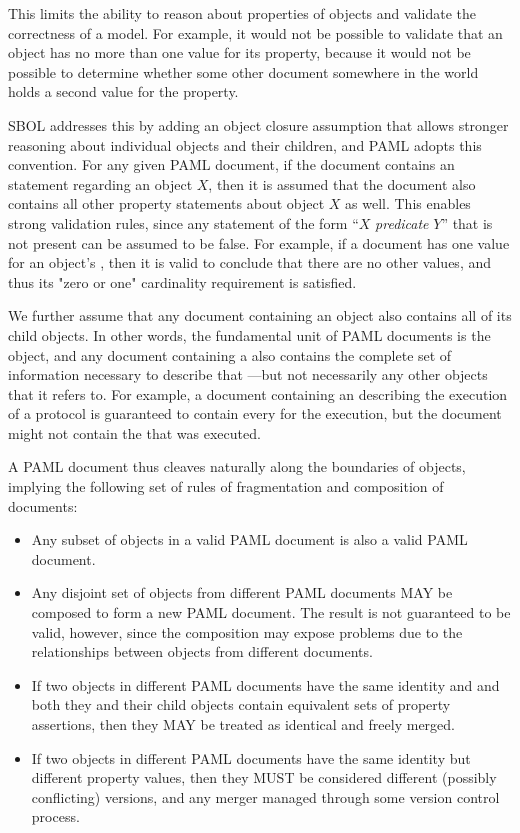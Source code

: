 This limits the ability to reason about properties of objects and validate the correctness of a model.
For example, it would not be possible to validate that an  object has no more than one value for its  property, because it would not be possible to determine whether some other document somewhere in the world holds a second value for the property.

SBOL addresses this by adding an object closure assumption that allows stronger reasoning about individual objects and their children, and PAML adopts this convention.
For any given PAML document, if the document contains an  statement regarding an  object $X$, then it is assumed that the document also contains all other property statements about object $X$ as well. 
This enables strong validation rules, since any statement of the form ``$X$ {\it predicate} $Y$'' that is not present can be assumed to be false.
For example, if a document has one value for an object's , then it is valid to conclude that there are no other  values, and thus its "zero or one" cardinality requirement is satisfied.

We further assume that any document containing an object also contains all of its child objects.
In other words, the fundamental unit of PAML documents is the  object, and any document containing a  also contains the complete set of information necessary to describe that ---but not necessarily any other  objects that it refers to.
For example, a document containing an  describing the execution of a protocol is guaranteed to contain every  for the execution, but the document might not contain the  that was executed.

A PAML document thus cleaves naturally along the boundaries of  objects, implying the following set of rules of fragmentation and composition of documents:
\begin{itemize}
\item Any subset of  objects in a valid PAML document is also a valid PAML document.
\item Any disjoint set of  objects from different PAML documents MAY be composed to form a new PAML document. The result is not guaranteed to be valid, however, since the composition may expose problems due to the relationships between  objects from different documents.
\item If two  objects in different PAML documents have the same identity and and both they and their child objects contain equivalent sets of property assertions, then they MAY be treated as identical and freely merged. 
\item  If two  objects in different PAML documents have the same identity but different property values, then they MUST be considered different (possibly conflicting) versions, and any merger managed through some version control process.
\end{itemize}


